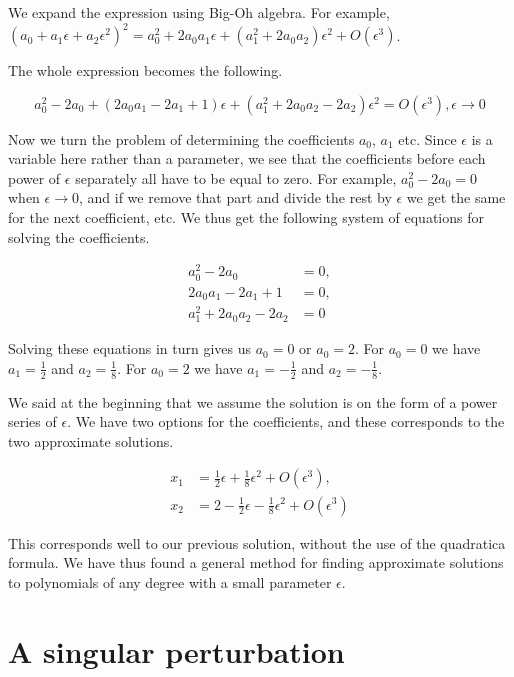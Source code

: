 \documentclass[12pt]{article}
\begin{document}
We expand the expression using Big-Oh algebra. For example, $(a_0 + a_1 \epsilon
+ a_2 \epsilon^2)^2 = a_0^2 + 2 a_0 a_1 \epsilon + (a_1^2 + 2 a_0 a_2) \epsilon^2 + O(\epsilon^3)$.

The whole expression becomes the following.

\begin{equation}
a_0^2 - 2 a_0 + (2 a_0 a_1 - 2 a_1 + 1)\epsilon + (a_1^2 + 2 a_0 a_2 - 2 a_2)
\epsilon^2 = O(\epsilon^3), \epsilon \to 0
\end{equation}

Now we turn the problem of determining the coefficients $a_0$, $a_1$ etc. Since
$\epsilon$ is a variable here rather than a parameter, we see that the
coefficients before each power of $\epsilon$ separately all have to be equal to
zero. For example, $a_0^2 - 2 a_0 = 0$ when $\epsilon \to 0$, and if we remove
that part and divide the rest by $\epsilon$ we get the same for the next
coefficient, etc. We thus get the following system of equations for solving the
coefficients.

\begin{align*}
a_0^2 - 2 a_0 &=0, \\
2 a_0 a_1 - 2 a_1 + 1 &= 0, \\
a_1^2 + 2 a_0 a_2 - 2 a_2 &= 0
\end{align*}

Solving these equations in turn gives us $a_0 = 0$ or $a_0 = 2$. For $a_0 = 0$ we
have $a_1 = \frac{1}{2}$ and $a_2 = \frac{1}{8}$. For $a_0 = 2$ we have $a_1 = -
\frac{1}{2}$ and $a_2 = - \frac{1}{8}$.

We said at the beginning that we assume the solution is on the form of a power
series of $\epsilon$. We have two options for the coefficients, and these
corresponds to the two approximate solutions.

\begin{align*}
x_1 &= \frac{1}{2} \epsilon + \frac{1}{8} \epsilon^2 + O(\epsilon^3), \\
x_2 &= 2 - \frac{1}{2} \epsilon - \frac{1}{8} \epsilon^2 + O(\epsilon^3)
\end{align*}

This corresponds well to our previous solution, without the use of the
quadratica formula. We have thus found a general method for finding approximate
solutions to polynomials of any degree with a small parameter $\epsilon$.

\section{A singular perturbation}
\end{document}
